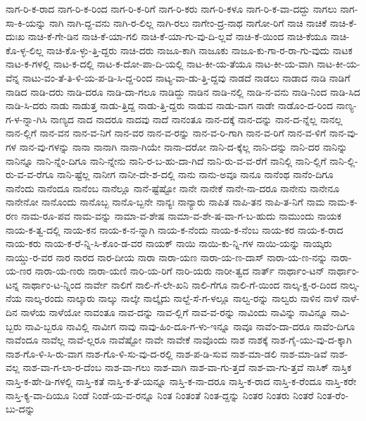 {ನಾಗ-ರಿ-ಕ-ರಾದ
ನಾಗ-ರಿ-ಕ-ರಿಂದ
ನಾಗ-ರಿ-ಕ-ರಿಗೆ
ನಾಗ-ರಿ-ಕರು
ನಾಗ-ರಿ-ಕಳೂ
ನಾಗ-ರಿ-ಕ-ವಾ-ದದ್ದು
ನಾಗಲು
ನಾಗ-ಸಾ-ಕಿ-ಯನ್ನು
ನಾಗಿ
ನಾಗಿ-ದ್ದ-ವನು
ನಾಗಿ-ರ-ಲಿಲ್ಲ
ನಾಗಿ-ರಲು
ನಾಗೇಂ-ದ್ರ-ನಾಥ
ನಾಗೋ-ರಿಗೆ
ನಾಚಿ
ನಾಚಿಕೆ
ನಾಚಿ-ಕೆ-ದುಃಖ
ನಾಚಿ-ಕೆ-ಗೇ-ಡಿನ
ನಾಚಿ-ಕೆ-ಯಾ-ಗಲಿ
ನಾಚಿ-ಕೆ-ಯಾ-ಗು-ವು-ದಿ-ಲ್ಲವೆ
ನಾಚಿ-ಕೆ-ಯಿಂದ
ನಾಚಿ-ಕೆಯೂ
ನಾಚಿ-ಕೊ-ಳ್ಳ-ಲಿಲ್ಲ
ನಾಚಿ-ಕೊ-ಳ್ಳು-ತ್ತಿ-ದ್ದರು
ನಾಚಿ-ದರು
ನಾಜೂ-ಕಾಗಿ
ನಾಜೂಕು
ನಾಜೂ-ಕು-ಗಾ-ರ-ರಾ-ಗು-ವುದು
ನಾಟಕ
ನಾಟ-ಕ-ಗಳಲ್ಲಿ
ನಾಟ-ಕ-ದಲ್ಲಿ
ನಾಟ-ಕ-ದೋ-ಪಾ-ದಿ-ಯಲ್ಲಿ
ನಾಟ-ಕೀ-ಯ-ತೆಯೂ
ನಾಟ-ಕೀ-ಯ-ವಾಗಿ
ನಾಟ-ಕೀ-ಯ-ವೆನ್ನ
ನಾಟು-ವಂ-ತೆ-ತಿ-ಳಿ-ಯ-ಪ-ಡಿ-ಸಿ-ದ್ದ-ರಿಂದ
ನಾಟ್ಯ-ವಾ-ಡು-ತ್ತಿ-ದ್ದವು
ನಾಡದೆ
ನಾಡಲು
ನಾಡಾದ
ನಾಡಿ
ನಾಡಿಗೆ
ನಾಡಿದ
ನಾಡಿ-ದರು
ನಾಡಿ-ದರೂ
ನಾಡಿ-ದಾ-ಗಲೂ
ನಾಡಿದ್ದು
ನಾಡಿನ
ನಾಡಿ-ನಲ್ಲಿ
ನಾಡಿ-ನ-ವನು
ನಾಡಿ-ನಿಂದ
ನಾಡಿ-ಸಿದ
ನಾಡಿ-ಸಿ-ದರು
ನಾಡು
ನಾಡುತ್ತ
ನಾಡು-ತ್ತಿದ್ದ
ನಾಡು-ತ್ತಿ-ದ್ದರು
ನಾಡುವ
ನಾಡು-ವಾಗ
ನಾಡೇ
ನಾಡೊಂ-ದ-ರಿಂದ
ನಾಣ್ಯ-ಗ-ಳ-ನ್ನಾ-ಗಿಸಿ
ನಾಣ್ಯದ
ನಾದ
ನಾದರೂ
ನಾದವು
ನಾದೆ
ನಾನಂತೂ
ನಾನ-ದಕ್ಕೆ
ನಾನ-ದನ್ನು
ನಾನ-ದ-ನ್ನೆಲ್ಲ
ನಾನಲ್ಲ
ನಾನ-ಲ್ಲಿಗೆ
ನಾನ-ವನ
ನಾನ-ವ-ನಿಗೆ
ನಾನ-ವರ
ನಾನ-ವ-ರನ್ನು
ನಾನ-ವ-ರಿ-ಗಾಗಿ
ನಾನ-ವ-ರಿಗೆ
ನಾನ-ವ-ಳಿಗೆ
ನಾನ-ವು-ಗಳ
ನಾನ-ವು-ಗಳನ್ನು
ನಾನಾ
ನಾನಾಗಿ
ನಾನಾ-ಗಿಯೇ
ನಾನಾ-ದರೋ
ನಾನಿ-ದ-ಕ್ಕೆಲ್ಲ
ನಾನಿ-ದನ್ನು
ನಾನಿ-ದರ
ನಾನಿನ್ನು
ನಾನಿನ್ನೂ
ನಾನಿ-ನ್ನೆಂ-ದಿಗೂ
ನಾನಿ-ನ್ನೇನು
ನಾನಿ-ರ-ಬ-ಹು-ದಾ-ಗಿದೆ
ನಾನಿ-ರು-ವ-ವ-ರೆಗೆ
ನಾನಿಲ್ಲಿ
ನಾನಿ-ಲ್ಲಿಗೆ
ನಾನಿ-ಲ್ಲಿ-ರು-ವ-ವ-ರೆಗೂ
ನಾನಿ-ಷ್ಟೆಲ್ಲ
ನಾನೀಗ
ನಾನೀ-ದೇ-ಶ-ದಲ್ಲಿ
ನಾನು
ನಾನು-ಅವೂ
ನಾನೂ
ನಾನೆಂಥ
ನಾನೆಂ-ದಿಗೂ
ನಾನೆಂದು
ನಾನೆಂದೂ
ನಾನೆಂಬ
ನಾನೆಲ್ಲೂ
ನಾನೆ-ಷ್ಟೆಷ್ಟೋ
ನಾನೇ
ನಾನೇಕೆ
ನಾನೇ-ನಾ-ದರೂ
ನಾನೇನು
ನಾನೇನೂ
ನಾನೇನೋ
ನಾನೊಂದು
ನಾನೊಬ್ಬ
ನಾನೊ-ಬ್ಬನೇ
ನಾನ್ಯಃ
ನಾನ್ಯಾರು
ನಾಪಿತ
ನಾಪಿ-ತನ
ನಾಪಿ-ತ-ನಿಗೆ
ನಾಮ
ನಾಮ-ಕ-ರಣ
ನಾಮ-ರೂ-ಪವ
ನಾಮ-ವನ್ನು
ನಾಮಾ-ವ-ಶೇಷ
ನಾಮಾ-ವ-ಶೇ-ಷ-ವಾ-ಗ-ಬ-ಹುದು
ನಾಮುಂದು
ನಾಯಕ
ನಾಯ-ಕ-ತ್ವ-ದಲ್ಲಿ
ನಾಯ-ಕನ
ನಾಯ-ಕ-ನ-ನ್ನಾಗಿ
ನಾಯ-ಕ-ನೆಂದು
ನಾಯ-ಕ-ನೆಂಬ
ನಾಯ-ಕರ
ನಾಯ-ಕ-ರಾದ
ನಾಯ-ಕರು
ನಾಯ-ಕ-ರೆ-ನ್ನಿ-ಸಿ-ಕೊಂ-ಡ-ವರ
ನಾಯಕ್
ನಾಯಿ
ನಾಯಿ-ಕು-ನ್ನಿ-ಗಳ
ನಾಯಿ-ಯನ್ನು
ನಾಯ್ಕರು
ನಾಯ್ಡು-ರ-ವರ
ನಾರ
ನಾರದ
ನಾರ-ದೀಯ
ನಾರಾ
ನಾರಾ-ಯಣ
ನಾರಾ-ಯ-ಣ-ದಾಸ್
ನಾರಾ-ಯ-ಣ-ನನ್ನು
ನಾರಾ-ಯ-ಣರ
ನಾರಾ-ಯ-ಣರು
ನಾರಾ-ಯಣಿ
ನಾರಿ-ಯ-ರಿಗೆ
ನಾರಿ-ಯರು
ನಾರೀ-ತ್ವದ
ನಾರ್ತ್
ನಾರ್ಥಾಂ-ಟನ್
ನಾರ್ಥಾಂ-ಟನ್ನ
ನಾರ್ಥಾಂ-ಟ-ನ್ನಿಂದ
ನಾರ್ವೇ
ನಾಲಿಗೆ
ನಾಲಿ-ಗೆ-ಲೇ-ಖನಿ
ನಾಲಿ-ಗೆಗೂ
ನಾಲಿ-ಗೆ-ಯಿಂದ
ನಾಲ್ಕ-ಕ್ಷ-ರ-ದಿಂದ
ನಾಲ್ಕ-ನೆಯ
ನಾಲ್ಕ-ರಂದು
ನಾಲ್ಕಾರು
ನಾಲ್ಕು
ನಾಲ್ಕೇ
ನಾಲ್ಕೈದು
ನಾಲ್ದೆ-ಸೆ-ಗ-ಳಲ್ಲೂ
ನಾಲ್ವ-ರನ್ನು
ನಾಲ್ವರು
ನಾಳಿನ
ನಾಳೆ
ನಾಳೆ-ದಿನ
ನಾಳೆಯ
ನಾಳೆಯೋ
ನಾವಂತೂ
ನಾವ-ದನ್ನು
ನಾವ-ಲ್ಲಿಗೆ
ನಾವ-ವ-ರನ್ನು
ನಾವಿಂದು
ನಾವಿನ್ನು
ನಾವಿನ್ನೂ
ನಾವಿ-ಬ್ಬರು
ನಾವಿ-ಬ್ಬರೂ
ನಾವಿಲ್ಲಿ
ನಾವೀಗ
ನಾವು
ನಾವು-ಹಿಂ-ದೂ-ಗ-ಳು-ಇನ್ನೂ
ನಾವೂ
ನಾವೆಂ-ದಾ-ದರೂ
ನಾವೆಂ-ದಿಗೂ
ನಾವೆಂದೂ
ನಾವೆಲ್ಲ
ನಾವೆ-ಲ್ಲರೂ
ನಾವೆಷ್ಟೋ
ನಾವೇ
ನಾವೇಕೆ
ನಾವೊಂದು
ನಾಶ
ನಾಶಕ್ಕೆ
ನಾಶ-ಗೈ-ಯು-ವು-ದ-ಕ್ಕಾಗಿ
ನಾಶ-ಗೊ-ಳಿ-ಸಿ-ರು-ವಾಗ
ನಾಶ-ಗೊ-ಳಿ-ಸು-ವು-ದ-ರಲ್ಲಿ
ನಾಶ-ಪ-ಡಿ-ಸುವ
ನಾಶ-ಮಾ-ಡಲಿ
ನಾಶ-ಮಾ-ಡಿವೆ
ನಾಶ-ವಲ್ಲ
ನಾಶ-ವಾ-ಗ-ಲಾ-ರ-ದೆಂಬ
ನಾಶ-ವಾ-ಗಲು
ನಾಶ-ವಾಗಿ
ನಾಶ-ವಾ-ಗು-ತ್ತದೆ
ನಾಶ-ವಾ-ಗು-ತ್ತವೆ
ನಾಸಿಕ್
ನಾಸ್ತಿಕ
ನಾಸ್ತಿ-ಕ-ಹೇ-ಡಿ-ಗಳಲ್ಲಿ
ನಾಸ್ತಿ-ಕತೆ
ನಾಸ್ತಿ-ಕ-ತೆ-ಯನ್ನೂ
ನಾಸ್ತಿ-ಕ-ನಾ-ದರೂ
ನಾಸ್ತಿ-ಕ-ರಾದ
ನಾಸ್ತಿ-ಕ-ರೆಂದೂ
ನಾಸ್ತಿ-ಕರೇ
ನಾಸ್ತಿ-ಕ್ಯ-ವಾ-ದಿಯೂ
ನಿಂಡೆ
ನಿಂಡೆ-ಯ-ವ-ರನ್ನೂ
ನಿಂತ
ನಿಂತಂತೆ
ನಿಂತ-ದ್ದನ್ನು
ನಿಂತರ
ನಿಂತರು
ನಿಂತರೆ
ನಿಂತ-ರೆಂ-ಬು-ದನ್ನು
}
